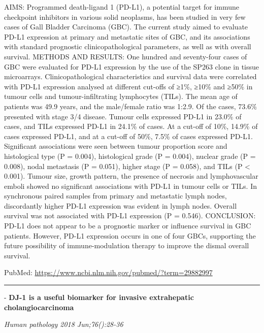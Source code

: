 \documentclass[]{article}
\begin{document}
AIMS: Programmed death-ligand 1 (PD-L1), a potential target for immune
checkpoint inhibitors in various solid neoplasms, has been studied in
very few cases of Gall Bladder Carcinoma (GBC). The current study aimed
to evaluate PD-L1 expression at primary and metastatic sites of GBC, and
its associations with standard prognostic clinicopathological
parameters, as well as with overall survival. METHODS AND RESULTS: One
hundred and seventy-four cases of GBC were evaluated for PD-L1
expression by the use of the SP263 clone in tissue microarrays.
Clinicopathological characteristics and survival data were correlated
with PD-L1 expression analysed at different cut-offs of ≥1\%, ≥10\% and
≥50\% in tumour cells and tumour-infiltrating lymphocytes (TILs). The
mean age of patients was 49.9 years, and the male/female ratio was
1:2.9. Of the cases, 73.6\% presented with stage 3/4 disease. Tumour
cells expressed PD-L1 in 23.0\% of cases, and TILs expressed PD-L1 in
24.1\% of cases. At a cut-off of 10\%, 14.9\% of cases expressed PD-L1,
and at a cut-off of 50\%, 7.5\% of cases expressed PD-L1. Significant
associations were seen between tumour proportion score and histological
type (P = 0.004), histological grade (P = 0.004), nuclear grade (P =
0.008), nodal metastasis (P = 0.051), higher stage (P = 0.058), and TILs
(P \textless{} 0.001). Tumour size, growth pattern, the presence of
necrosis and lymphovascular emboli showed no significant associations
with PD-L1 in tumour cells or TILs. In synchronous paired samples from
primary and metastatic lymph nodes, discordantly higher PD-L1 expression
was evident in lymph nodes. Overall survival was not associated with
PD-L1 expression (P = 0.546). CONCLUSION: PD-L1 does not appear to be a
prognostic marker or influence survival in GBC patients. However, PD-L1
expression occurs in one of four GBCs, supporting the future possibility
of immune-modulation therapy to improve the dismal overall survival.

PubMed: \url{https://www.ncbi.nlm.nih.gov/pubmed/?term=29882997}

{}

{}

\begin{center}\rule{0.5\linewidth}{\linethickness}\end{center}

 - \textbf{DJ-1 is a useful biomarker for invasive extrahepatic
cholangiocarcinoma}

\emph{Human pathology 2018 Jun;76():28-36}
\end{document}
